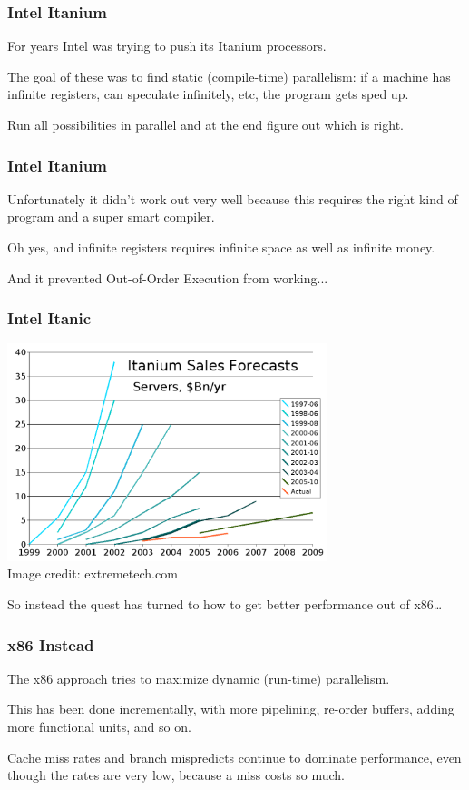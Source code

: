 \begin{frame}
\frametitle{Intel Itanium}

For years Intel was trying to push its Itanium processors. 

The goal of these was to find static (compile-time) parallelism: if a machine has infinite registers, can speculate infinitely, etc, the program gets sped up. 

Run all possibilities in parallel and at the end figure out which is right.

\end{frame}

\begin{frame}
\frametitle{Intel Itanium}

Unfortunately it didn't work out very well because this requires the right kind of program and a super smart compiler. 

Oh yes, and infinite registers requires infinite space as well as infinite money. 

And it prevented Out-of-Order Execution from working...

\end{frame}

\begin{frame}
\frametitle{Intel Itanic}

\begin{center}
	\includegraphics[width=0.7\textwidth]{images/itanic.png}\\
\hfill	Image credit: extremetech.com
\end{center}

So instead the quest has turned to how to get better performance out of x86\ldots

\end{frame}



\begin{frame}
\frametitle{x86 Instead}

The x86 approach tries to maximize dynamic (run-time) parallelism. 

This has been done incrementally, with more pipelining, re-order buffers, adding more functional units, and so on. 

Cache miss rates and branch mispredicts continue to dominate performance, even though the rates are very low, because a miss costs so much. 

\end{frame}



